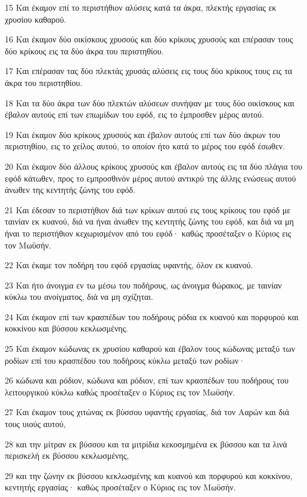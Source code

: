 \par 15 Και έκαμον επί το περιστήθιον αλύσεις κατά τα άκρα, πλεκτής εργασίας εκ χρυσίου καθαρού.
\par 16 Και έκαμον δύο οικίσκους χρυσούς και δύο κρίκους χρυσούς και επέρασαν τους δύο κρίκους εις τα δύο άκρα του περιστηθίου.
\par 17 Και επέρασαν τας δύο πλεκτάς χρυσάς αλύσεις εις τους δύο κρίκους τους εις τα άκρα του περιστηθίου.
\par 18 Και τα δύο άκρα των δύο πλεκτών αλύσεων συνήψαν με τους δύο οικίσκους και έβαλον αυτούς επί των επωμίδων του εφόδ, εις το έμπροσθεν μέρος αυτού.
\par 19 Και έκαμον δύο κρίκους χρυσούς και έβαλον αυτούς επί των δύο άκρων του περιστηθίου, εις το χείλος αυτού, το οποίον ήτο κατά το μέρος του εφόδ έσωθεν.
\par 20 Και έκαμον δύο άλλους κρίκους χρυσούς και έβαλον αυτούς εις τα δύο πλάγια του εφόδ κάτωθεν, προς το εμπροσθινόν μέρος αυτού αντικρύ της άλλης ενώσεως αυτού άνωθεν της κεντητής ζώνης του εφόδ.
\par 21 Και έδεσαν το περιστήθιον διά των κρίκων αυτού εις τους κρίκους του εφόδ με ταινίαν εκ κυανού, διά να ήναι άνωθεν της κεντητής ζώνης του εφόδ, και διά να μη ήναι το περιστήθιον κεχωρισμένον από του εφόδ· καθώς προσέταξεν ο Κύριος εις τον Μωϋσήν.
\par 22 Και έκαμε τον ποδήρη του εφόδ εργασίας υφαντής, όλον εκ κυανού.
\par 23 Και ήτο άνοιγμα εν τω μέσω του ποδήρους, ως άνοιγμα θώρακος, με ταινίαν κύκλω του ανοίγματος, διά να μη σχίζηται.
\par 24 Και έκαμον επί των κρασπέδων του ποδήρους ρόδια εκ κυανού και πορφυρού και κοκκίνου και βύσσου κεκλωσμένης.
\par 25 Και έκαμον κώδωνας εκ χρυσίου καθαρού και έβαλον τους κώδωνας μεταξύ των ροδίων επί του κρασπέδου του ποδήρους κύκλω μεταξύ των ροδίων·
\par 26 κώδωνα και ρόδιον, κώδωνα και ρόδιον, επί των κρασπέδων του ποδήρους του λειτουργικού κύκλω καθώς προσέταξεν ο Κύριος εις τον Μωϋσήν.
\par 27 Και έκαμον τους χιτώνας εκ βύσσου υφαντής εργασίας, διά τον Ααρών και διά τους υιούς αυτού,
\par 28 και την μίτραν εκ βύσσου και τα μιτρίδια κεκοσμημένα εκ βύσσου και τα λινά περισκελή εκ βύσσου κεκλωσμένης,
\par 29 και την ζώνην εκ βύσσου κεκλωσμένης και κυανού και πορφυρού και κοκκίνου, κεντητής εργασίας· καθώς προσέταξεν ο Κύριος εις τον Μωϋσήν.
